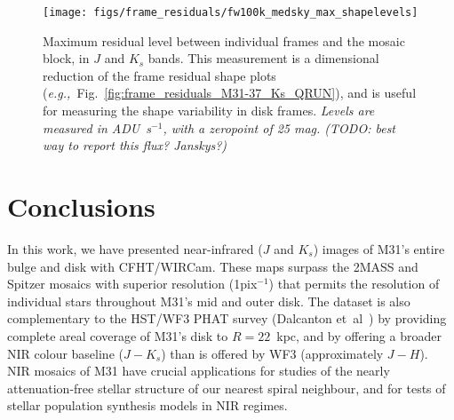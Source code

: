 \documentclass[iop]{emulateapj}
\newcommand{\eg}{\textit{e.g.,~}}
\newcommand{\etal}{et~al~}
\newcommand{\comment}[1]{\textcolor{OliveGreen}{\textit{#1}}} %
\newcommand{\Fig}[1]{Fig.~\ref{fig:#1}}  %
\begin{document}
\begin{figure}[t]
\centering
\texttt{[image: figs/frame\_residuals/fw100k\_medsky\_max\_shapelevels]}
\caption{Maximum residual level between individual frames and the mosaic block, in $J$ and $K_s$ bands.
This measurement is a dimensional reduction of the frame residual shape plots (\eg \Fig{frame_residuals_M31-37_Ks_QRUN}), and is useful for measuring the shape variability in disk frames.
\comment{Levels are measured in ADU~s$^{-1}$, with a zeropoint of 25 mag. (TODO: best way to report this flux? Janskys?)}
}
\label{fig:max_shapelevels_hist}
\end{figure}




\section{Conclusions}
\label{sec:conclusions}

In this work, we have presented near-infrared ($J$ and $K_s$) images of M31's entire bulge and disk with CFHT/WIRCam. These maps surpass the 2MASS \citep{Beaton:2007} and Spitzer \citep{Barmby:2006} mosaics with superior resolution (1\arcsec pix$^{-1}$) that permits the resolution of individual stars throughout M31's mid and outer disk. The dataset is also complementary to the HST/WF3 PHAT survey (Dalcanton \etal) by providing complete areal coverage of M31's disk to $R=22$~kpc, and by offering a broader NIR colour baseline ($J-K_s$) than is offered by WF3 (approximately  $J-H$). NIR mosaics of M31 have crucial applications for studies of the nearly attenuation-free stellar structure of our nearest spiral neighbour, and for tests of stellar population synthesis models in NIR regimes.
\end{document}
